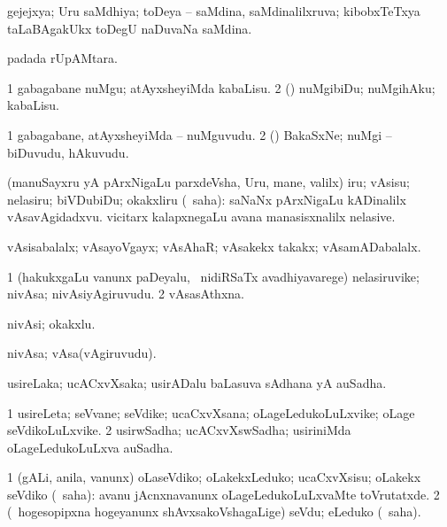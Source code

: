 \bentry
{}
\gl{\gu}
\bmng
gejejxya; Uru saMdhiya; toDeya -- saMdina, saMdinalilxruva; kibobxTeTxya taLaBAgakUkx toDegU naDuvaNa saMdina. 
\emng
\eentry

\bentry
{}
\gl{\sakirx}
\bmng
{} padada rUpAMtara. 
\emng
\eentry

\bentry
{}
\gl{\sakirx}
\bmng
\bnum
\num{1} gabagabane nuMgu; atAyxsheyiMda kabaLisu. 
\num{2} (\rUpa) nuMgibiDu; nuMgihAku; kabaLisu. 
\enum
\emng
\eentry

\bentry
{}
\gl{\nA}
\bmng
\bnum
\num{1} gabagabane, atAyxsheyiMda -- nuMguvudu. 
\num{2} (\rUpa) BakaSxNe; nuMgi -- biDuvudu, hAkuvudu. 
\enum
\emng
\eentry

\bentry
{}
\gl{\sakirx}
\bmng
(manuSayxru yA pArxNigaLu parxdeVsha, Uru, mane, \mo valilx) iru; vAsisu; nelasiru; biVDubiDu; okakxliru (\rUpa\ saha):  saNaNx pArxNigaLu kADinalilx vAsavAgidadxvu.  vicitarx kalapxnegaLu avana manasisxnalilx nelasive. 
\emng
\eentry

\bentry
{}
\gl{\gu}
\bmng
vAsisabalalx; vAsayoVgayx; vAsAhaR; vAsakekx takakx; vAsamADabalalx. 
\emng
\eentry

\bentry
{}
\gl{\nA}
\bmng
\bnum
\num{1} (hakukxgaLu \mo vanunx paDeyalu, \kanmu\ nidiRSaTx avadhiyavarege) nelasiruvike; nivAsa; nivAsiyAgiruvudu. 
\num{2} vAsasAthxna. 
\enum
\emng
\eentry

\bentry
{}
\gl{\nA}
\bmng
nivAsi; okakxlu. 
\emng
\eentry

\bentry
{}
\gl{\nA}
\bmng
nivAsa; vAsa(vAgiruvudu). 
\emng
\eentry

\bentry
{}
\gl{\nA}
\bmng
usireLaka; ucACxvXsaka; usirADalu baLasuva sAdhana yA auSadha. 
\emng
\eentry

\bentry
{}
\gl{\nA}
\bmng
\bnum
\num{1} usireLeta; seVvane; seVdike; ucaCxvXsana; oLageLedukoLuLxvike; oLage seVdikoLuLxvike. 
\num{2} usirwSadha; ucACxvXswSadha; usiriniMda oLageLedukoLuLxva auSadha. 
\enum
\emng
\eentry

\bentry
{}
\gl{\sakirx}
\bmng
\bnum
\num{1} (gALi, anila, \mo vanunx) oLaseVdiko; oLakekxLeduko; ucaCxvXsisu; oLakekx seVdiko (\rUpa\ saha):  avanu jAcnxnavanunx oLageLedukoLuLxvaMte toVrutatxde. 
\num{2} (\kanmu\ hogesopipxna hogeyanunx shAvxsakoVshagaLige) seVdu; eLeduko (\rUpa\ saha). 
\enum
\emng

